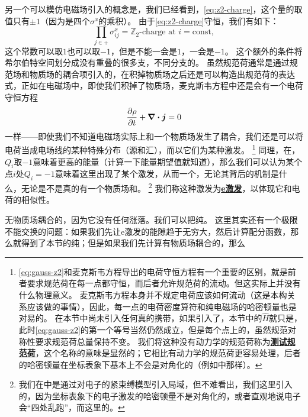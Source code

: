 \documentclass[hyperref, UTF8, a4paper]{ctexart}
\newcommand*{\const}{\mathrm{const}}
\newcommand*{\concept}[1]{\underline{\textbf{#1}}}
\newcommand*{\Ztwo}{$\mathbb{Z}_2$}
\begin{document}
另一个可以模仿电磁场引入的概念是，我们已经看到，\eqref{eq:z2-charge}，这个量的取值只有$\pm 1$（因为是四个$\sigma^x$的乘积）。
由于\eqref{eq:z2-charge}守恒，我们有如下：
\begin{equation}
    \prod_{j \in +} \sigma^x_{ij} = \text{\Ztwo -charge at $i$} = \const,
    \label{eq:gauss-z2}
\end{equation}
这个常数可以取$1$也可以取$-1$，但是不能一会是$1$，一会是$-1$。
这个额外的条件将希尔伯特空间划分成没有重叠的很多支，不同分支的。
虽然规范荷通常是通过规范场和物质场的耦合项引入的，在积掉物质场之后还是可以构造出规范荷的表达式，正如在电磁场中，即使我们积掉了物质场，麦克斯韦方程中还是会有一个电荷守恒方程
\[
    \pdv{\rho}{t} + \div{\vb*{j}} = 0
\]
一样——即使我们不知道电磁场实际上和一个物质场发生了耦合，我们还是可以将电荷当成电场线的某种特殊分布（源和汇），而以它们为某种激发。%
\footnote{
    \eqref{eq:gauss-z2}和麦克斯韦方程导出的电荷守恒方程有一个重要的区别，就是前者要求规范荷在每一点都守恒，而后者允许规范荷的流动。但这实际上并没有什么物理意义。
    麦克斯韦方程本身并不规定电荷应该如何流动（这是本构关系应该做的事情），因此，每一点的电荷密度算符和纯电磁场的哈密顿量也是对易的。
    在本节中尚未引入任何真的携带，如果引入了，本节中的$\hat{H}$就只是，此时\eqref{eq:gauss-z2}的第一个等号当然仍然成立，但是每个点上的，虽然规范对称性要求规范荷总量保持不变。 %
    我们将这种没有动力学的规范荷称为\concept{测试规范荷}，这个名称的意味是显然的；它相比有动力学的规范荷更容易处理，后者的哈密顿量在坐标表象下基本上不会是对角化的（例如中那样）。
}%
同理，在，$Q_i$取$-1$意味着更高的能量（计算一下能量期望值就知道），那么我们可以认为某个点$i$处$Q_i=-1$意味着这里出现了某个激发，从而一个，无论其背后的机制是什么，无论是不是真的有一个物质场和。%
\footnote{
    我们在中是通过对电子的紧束缚模型引入局域，但不难看出，我们这里引入的，因为坐标表象下的电子激发的哈密顿量不是对角化的，或者直观地说电子会“四处乱跑”，而这里的。
}%
我们称这种激发为\concept{e激发}，以体现它和电荷的相似性。

无物质场耦合的，因为它没有任何涨落。我们可以把纯。
这里其实还有一个极限不能交换的问题：如果我们先让e激发的能隙趋于无穷大，然后计算配分函数，那么就得到了本节的纯；但是如果我们先计算有物质场耦合的，那么 %
\end{document}
